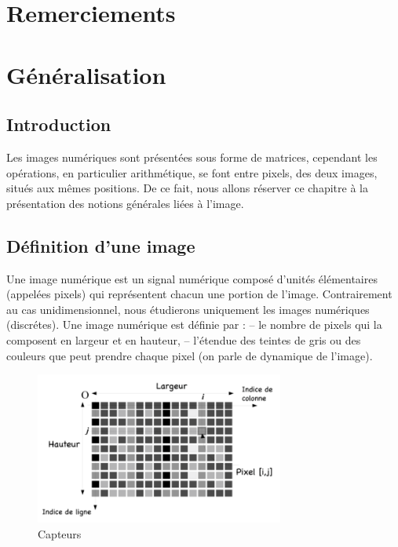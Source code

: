 \documentclass[12pt,a4paper]{report}
\numberwithin{equation}{subsection}
\numberwithin{equation}{section}
\begin{document}
\chapter*{Remerciements}

\tableofcontents
\chapter{Généralisation}
\section{Introduction}
Les images numériques sont présentées sous forme de matrices, cependant les
opérations, en particulier arithmétique, se font entre pixels, des deux images, situés aux
mêmes positions.
De ce fait, nous allons réserver ce chapitre à la présentation des notions générales liées
à l’image.

\section{Définition d’une image}

Une image numérique est un signal numérique composé d’unités élémentaires (appelées pixels) qui représentent chacun une portion de l’image. Contrairement au cas unidimensionnel, nous étudierons uniquement les images numériques (discrétes). \newline Une image numérique est déﬁnie par : \newline– le nombre de pixels qui la composent en largeur et en hauteur, \newline– l’étendue des teintes de gris ou des couleurs que peut prendre chaque pixel (on parle de dynamique de l’image).
\newline
\begin{figure}[!h]
    \centering
    \begin{center}
        \includegraphics[height=5cm,width=10cm\textwidth]{imagenum.png}
    \end{center}
    \caption{Capteurs}
\end{figure}
\end{document}
